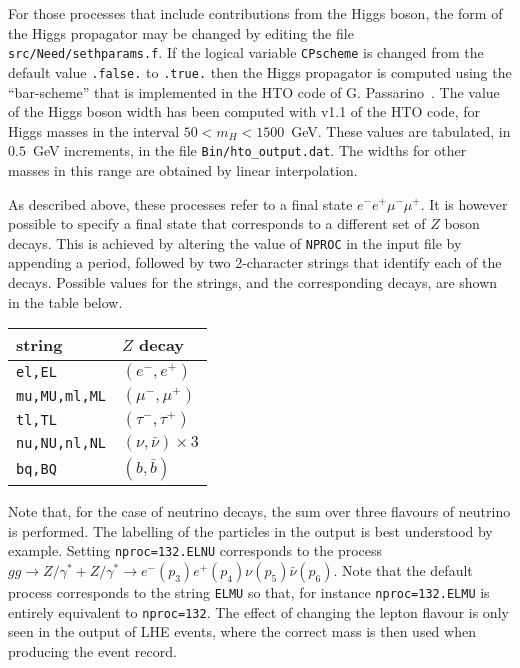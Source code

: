 For those processes that include contributions from the Higgs boson, the form
of the Higgs propagator may be changed by editing the file
{\tt src/Need/sethparams.f}.  If the logical variable {\tt CPscheme} is
changed from the default value {\tt .false.} to {\tt .true.} then the
Higgs propagator is computed using the ``bar-scheme'' that is
implemented in the HTO code of G. Passarino~\cite{Goria:2011wa,Passarino:2010qk}.
The value of the Higgs boson width has been computed with v1.1 of the
HTO code, for Higgs masses in the interval $50 < m_H< 1500$~GeV.  These
values are tabulated, in $0.5$~GeV increments, in the file
{\tt Bin/hto\_output.dat}.  The widths for other masses in this range
are obtained by linear interpolation.

\label{specifyingZdecays}
As described above, these processes refer to a final state 
$e^- e^+ \mu^- \mu^+$.  It is however possible to specify a final state
that corresponds to a different set of $Z$ boson decays.  This is achieved
by altering the value of {\tt NPROC} in the input file by appending a
period, followed by two 2-character strings that identify each of the decays.
Possible values for the strings, and the corresponding decays, are
shown in the table below.
\begin{center}
\begin{tabular}{ll}
string & $Z$ decay \\
\hline
{\tt el,EL} & $(e^-,e^+)$ \\
{\tt mu,MU,ml,ML} & $(\mu^-,\mu^+)$ \\
{\tt tl,TL} & $(\tau^-,\tau^+)$ \\
{\tt nu,NU,nl,NL} & $(\nu,\bar\nu) \times 3$ \\
{\tt bq,BQ} & $(b,\bar b)$ \\
\end{tabular}
\end{center}
Note that, for the case of neutrino decays, the sum over three flavours of
neutrino is performed.  The labelling of the particles in the output is best
understood by example.  Setting {\tt nproc=132.ELNU} corresponds to the
process $gg \to Z/\gamma^*+Z/\gamma^* \to e^-(p_3) e^+(p_4) \nu(p_5) \bar\nu(p_6)$.
Note that the default process corresponds to the string {\tt ELMU} so that,
for instance {\tt nproc=132.ELMU} is entirely equivalent to
{\tt nproc=132}.
The effect of changing the lepton flavour is only seen in the output
of LHE events, where the correct mass is then used when producing the
event record.

